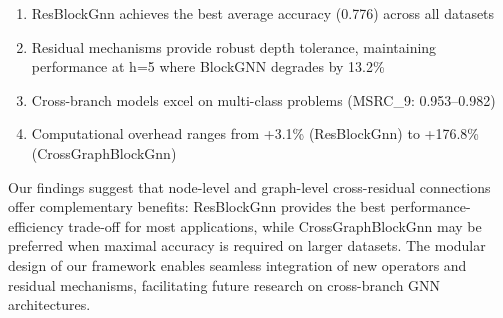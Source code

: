 \begin{enumerate}
    \item ResBlockGnn achieves the best average accuracy (0.776) across all datasets
    \item Residual mechanisms provide robust depth tolerance, maintaining performance at h=5 where BlockGNN degrades by 13.2\%
    \item Cross-branch models excel on multi-class problems (MSRC\_9: 0.953--0.982)
    \item Computational overhead ranges from +3.1\% (ResBlockGnn) to +176.8\% (CrossGraphBlockGnn)
\end{enumerate}

Our findings suggest that node-level and graph-level cross-residual connections offer complementary benefits: ResBlockGnn provides the best performance-efficiency trade-off for most applications, while CrossGraphBlockGnn may be preferred when maximal accuracy is required on larger datasets. The modular design of our framework enables seamless integration of new operators and residual mechanisms, facilitating future research on cross-branch GNN architectures.
